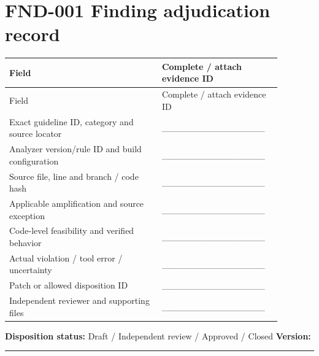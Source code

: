 \documentclass[10pt,letterpaper]{article}
\begin{document}
\section{FND-001 Finding adjudication record}
\small\setlength{\tabcolsep}{3pt}\renewcommand{\arraystretch}{1.15}
\begin{longtable}{p{0.52\linewidth}p{0.36\linewidth}}
\toprule
Field & Complete / attach evidence ID\\ \midrule
\endfirsthead
\toprule
Field & Complete / attach evidence ID\\ \midrule
\endhead
Exact guideline ID, category and source locator & \_\_\_\_\_\_\_\_\_\_\_\_\_\_\_\_\\
Analyzer version/rule ID and build configuration & \_\_\_\_\_\_\_\_\_\_\_\_\_\_\_\_\\
Source file, line and branch / code hash & \_\_\_\_\_\_\_\_\_\_\_\_\_\_\_\_\\
Applicable amplification and source exception & \_\_\_\_\_\_\_\_\_\_\_\_\_\_\_\_\\
Code-level feasibility and verified behavior & \_\_\_\_\_\_\_\_\_\_\_\_\_\_\_\_\\
Actual violation / tool error / uncertainty & \_\_\_\_\_\_\_\_\_\_\_\_\_\_\_\_\\
Patch or allowed disposition ID & \_\_\_\_\_\_\_\_\_\_\_\_\_\_\_\_\\
Independent reviewer and supporting files & \_\_\_\_\_\_\_\_\_\_\_\_\_\_\_\_\\
\bottomrule
\end{longtable}
\normalsize
\textbf{Disposition status:} Draft / Independent review / Approved / Closed \quad \textbf{Version:} \rule{1.4cm}{0.4pt}
\end{document}
